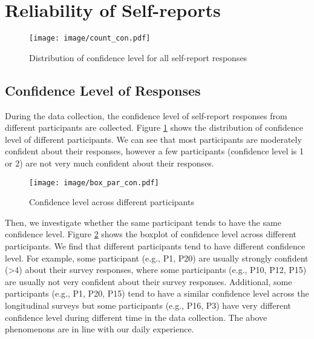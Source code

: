 \documentclass[sigconf]{acmart}
\begin{document}
\section{Reliability of Self-reports}
\label{sec:reliability}


\begin{figure}
    \centering
    \texttt{[image: image/count\_con.pdf]}
    \caption{Distribution of confidence level for all self-report responses}
    \label{fig:dis_con}
\end{figure}

\subsection{Confidence Level of Responses}

During the data collection, the confidence level of self-report responses from different participants are collected.
Figure \ref{fig:dis_con} shows the distribution of confidence level of different participants. We can see that most participants are moderately confident about their responses, however a few participants (confidence level is 1 or 2) are not very much confident about their responses. 



\begin{figure}
    \centering
    \texttt{[image: image/box\_par\_con.pdf]}
    \caption{Confidence level across different participants}
    \label{fig:box_confi}
\end{figure}

Then, we investigate whether the same participant tends to have the same confidence level. Figure \ref{fig:box_confi} shows the boxplot of confidence level across different participants. We find that different participants tend to have different confidence level. For example,  some participant (e.g., P1, P20) are usually strongly confident (>4) about their survey responses, where some participants (e.g., P10, P12, P15) are usually not very confident about their survey responses. Additional, some participants (e.g., P1, P20, P15) tend to have a similar confidence level across the longitudinal surveys but some participants (e.g., P16, P3) have very different confidence level during different time in the data collection. The above phenomenons are in line with our daily experience.
\end{document}
